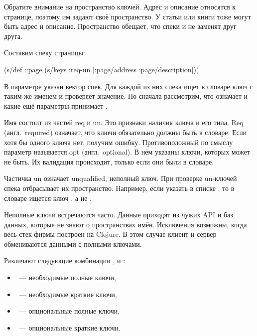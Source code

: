 
Обратите внимание на пространство ключей. Адрес и описание относятся к странице,
поэтому им задают своё пространство. У статьи или книги тоже могут быть адрес и
описание. Пространство обещает, что спеки  и
 не заменят друг друга.

Составим спеку страницы:

\begin{clojure}
(s/def ::page
  (s/keys :req-un [:page/address
                   :page/description]))
\end{clojure}


В параметре  указан вектор спек. Для каждой из них спека ищет в
словаре ключ с таким же именем и проверяет значение. Но сначала рассмотрим, что
означает  и какие ещё параметры принимает .

Имя  состоит из частей req и un. Это признаки наличия
ключа и его типа. Req (англ.~required) означает, что ключи обязательно должны
быть в словаре. Если хотя бы одного ключа нет, получим ошибку. Противоположный
по смыслу параметр называется opt (англ.~optional). В нём указаны ключи,
которых может не быть. Их валидация происходит, только если они были в словаре.


Частичка un означает unqualified, неполный ключ. При проверке un-ключей
спека отбрасывает их пространство. Например, если указать 
в списке , то в словаре ищется ключ , а не
.

Неполные ключи встречаются часто. Данные приходят из чужих API и баз данных,
которые не знают о пространствах имён. Исключения возможны, когда весь стек
фирмы построен на Clojure. В этом случае клиент и сервер обмениваются данными с
полными ключами.

Различают следующие комбинации ,  и :

\begin{itemize}

\item
  ~--- необходимые полные ключи,

\item
  ~--- необходимые краткие ключи,


\item
  ~--- опциональные полные ключи,


\item
  ~--- опциональные краткие ключи.

\end{itemize}

